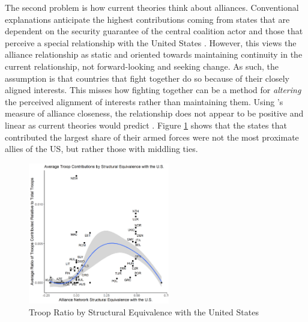 \documentclass[12pt,letterpaper]{article}
\begin{document}
		The second problem is how current theories think about alliances. Conventional explanations anticipate the highest contributions coming from states that are dependent on the security guarantee of the central coalition actor and those that perceive a special relationship with the United States \citep{haesebrouck_democraticparticipationair_2016, howorth_securitydefencepolicy_2014, graeger_revivalatlanticismnato_2009, biehl_strategiccultureseurope_2013}. However, this views the alliance relationship as static and oriented towards maintaining continuity in the current relationship, not forward-looking and seeking change. As such, the assumption is that countries that fight together do so because of their closely aligned interests. This misses how fighting together can be a method for \textit{altering} the perceived alignment of interests rather than maintaining them. Using \citet{benson_assessingvariationformal_2016}'s measure of alliance closeness, the relationship does not appear to be positive and linear as current theories would predict \citep{massie_democraticalliesfollowership_2016, haesebrouck_explainingmemberstates_2016, ringsmose_natoburdensharingredux_2010}. Figure \ref{fig:contr_sequiv} shows that the states that contributed the largest share of their armed forces were not the most proximate allies of the US, but rather those with middling ties.

		\begin{figure}[H]
			\centering
			\includegraphics[width=0.55\textwidth]{figures/contributions.png}
			\caption{Troop Ratio by Structural Equivalence with the United States}
			\label{fig:contr_sequiv}
		\end{figure}
		
\end{document}
